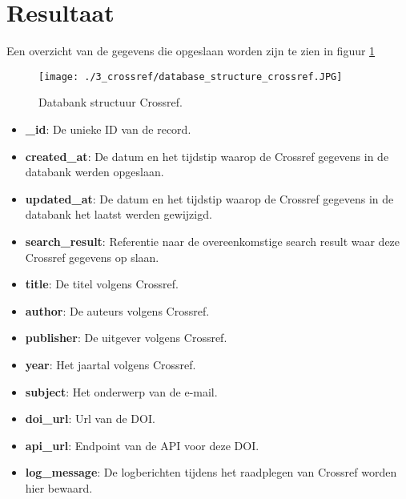 \section{Resultaat}
Een overzicht van de gegevens die opgeslaan worden zijn te zien in figuur \ref{fig:databank_structuur_crossref}
\begin{figure}[h!]
    \centering
    \texttt{[image: ./3\_crossref/database\_structure\_crossref.JPG]}
    \caption[Databank structuur Crossref.]{\label{fig:databank_structuur_crossref}Databank structuur Crossref.}
\end{figure}
\begin{itemize}
    \item \textbf{\_id}: De unieke ID van de record.
    \item \textbf{created\_at}: De datum en het tijdstip waarop de Crossref gegevens in de databank werden opgeslaan.
    \item \textbf{updated\_at}: De datum en het tijdstip waarop de Crossref gegevens in de databank het laatst werden gewijzigd. 
    \item \textbf{search\_result}: Referentie naar de overeenkomstige search result waar deze Crossref gegevens op slaan. 
    \item \textbf{title}: De titel volgens Crossref.
    \item \textbf{author}: De auteurs volgens Crossref. 
    \item \textbf{publisher}: De uitgever volgens Crossref.
    \item \textbf{year}: Het jaartal volgens Crossref.
    \item \textbf{subject}: Het onderwerp van de e-mail. 
    \item \textbf{doi\_url}: Url van de DOI. 
    \item \textbf{api\_url}: Endpoint van de API voor deze DOI. 
    \item \textbf{log\_message}: De logberichten tijdens het raadplegen van Crossref worden hier bewaard. 
\end{itemize}


